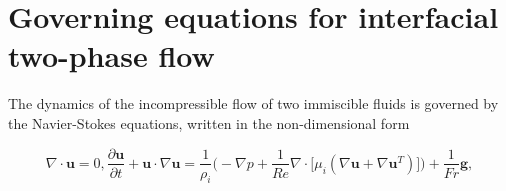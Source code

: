 

\section{Governing equations for interfacial two-phase flow}
\label{subsec: gov eqns}

The dynamics of the incompressible flow of two immiscible fluids is governed by the Navier-Stokes equations, written in the non-dimensional form

\begin{subequations}
 \begin{equation}
   \nabla \cdot {\bm u} = 0,
  \label{div free}
 \end{equation}

 \begin{equation}
      \frac{\partial {\bm u}}{\partial t} + {\bm u} \cdot \nabla {\bm u} = \frac{1}{\rho_i} \bigg(-\nabla p + \frac{1}{Re} \nabla \cdot \big[ \mu_i ( \nabla {\bm u} + \nabla {\bm u}^T ) \big] \bigg) + \frac{1}{Fr}{\bm g},
  \label{NS}
 \end{equation}
\end{subequations}

